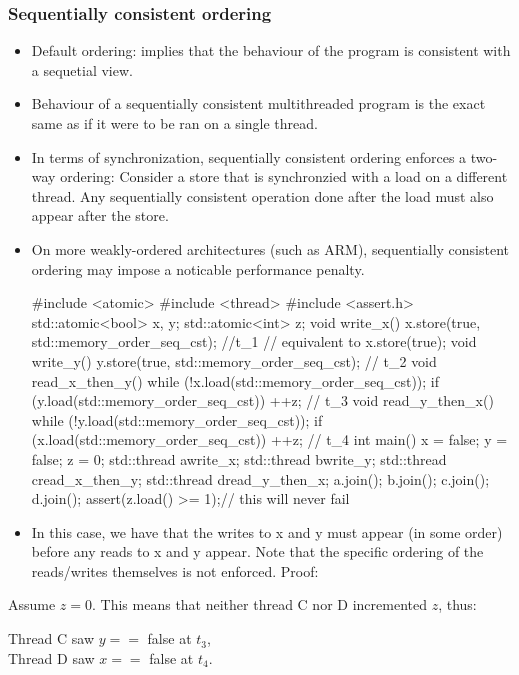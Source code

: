 \documentclass[11pt, a4paper]{article}
\theoremstyle{definition}
\theoremstyle{remark}
\begin{document}
\subsubsection{Sequentially consistent ordering}
\begin{itemize}
    \item Default ordering: implies that the behaviour of the program is consistent with a sequetial view.
    \item Behaviour of a sequentially consistent multithreaded program is the exact same as if it were to be ran on a single thread.
    \item In terms of synchronization, sequentially consistent ordering enforces a two-way ordering: Consider a store that is synchronzied with a load on a different thread. Any sequentially consistent operation done after the load must also appear after the store.
    \item On more weakly-ordered architectures (such as ARM), sequentially consistent ordering may impose a noticable performance penalty.
\newpage
\begin{cppcode}
#include <atomic>
#include <thread>
#include <assert.h>
std::atomic<bool> x, y;
std::atomic<int> z;
void write_x() {
    x.store(true, std::memory_order_seq_cst); //t_1 // equivalent to x.store(true);
}
void write_y() {
    y.store(true, std::memory_order_seq_cst); // t_2
}
void read_x_then_y() {
    while (!x.load(std::memory_order_seq_cst));
    if (y.load(std::memory_order_seq_cst)) ++z; // t_3
}
void read_y_then_x() {
    while (!y.load(std::memory_order_seq_cst));
    if (x.load(std::memory_order_seq_cst)) ++z; // t_4
}
int main() {
    x = false;
    y = false;
    z = 0;
    std::thread a{write_x};
    std::thread b{write_y};
    std::thread c{read_x_then_y};
    std::thread d{read_y_then_x};
    a.join();
    b.join();
    c.join();
    d.join();
    assert(z.load() >= 1);// this will never fail
}
\end{cppcode}
    \item In this case, we have that the writes to x and y must appear (in some order) before any reads to x and y appear. Note that the specific ordering of the reads/writes themselves is not enforced. Proof:
\end{itemize}
Assume $z = 0$. This means that neither thread C nor D incremented $z$, thus:
\begin{center}
Thread C saw $ y == $ false at $t_3$, \\
Thread D saw $x ==$ false at $t_4$. \\
\end{center}
\end{document}
